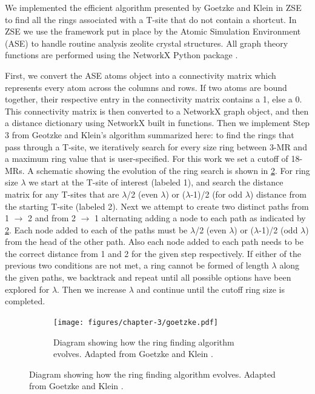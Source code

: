 \documentclass[preprint,numrefs,noinfo,sort&compress]{elsarticle}
\begin{document}
We implemented the efficient algorithm presented by Goetzke and Klein \cite{goetzke-properties-1991} in ZSE \cite{crum-jtcrumzse-2022} to find all the rings associated with a T-site that do not contain a shortcut. In ZSE we use the framework put in place by the Atomic Simulation Environment (ASE) \cite{hjorth-larsen-atomic-2017} to handle routine analysis zeolite crystal structures. All graph theory functions are performed using the NetworkX Python package \cite{hagberg-exploring-2008}. 

First, we convert the ASE atoms object into a connectivity matrix which represents every atom across the columns and rows. If two atoms are bound together, their respective entry in the connectivity matrix contains a 1, else a 0. This connectivity matrix is then converted to a NetworkX graph object, and then a distance dictionary using NetworkX built in functions. Then we implement Step 3 from Geotzke and Klein's algorithm \cite{goetzke-properties-1991} summarized here: to find the rings that pass through a T-site, we iteratively search for every size ring between 3-MR and a maximum ring value that is user-specified. For this work we set a cutoff of 18-MRs. A schematic showing the evolution of the ring search is shown in \cref{fig:goetzke}. For ring size \(\lambda\) we start at the T-site of interest (labeled 1), and search the distance matrix for any T-sites that are \(\lambda\)/2 (even \(\lambda\)) or (\(\lambda\)-1)/2 (for odd \(\lambda\)) distance from the starting T-site (labeled 2). Next we attempt to create two distinct paths from 1 \(\rightarrow\) 2 and from 2 \(\rightarrow\) 1 alternating adding a node to each path as indicated by \cref{fig:goetzke}. Each node added to each of the paths must be \(\lambda\)/2 (even \(\lambda\)) or (\(\lambda\)-1)/2 (odd \(\lambda\)) from the head of the other path. Also each node added to each path needs to be the correct distance from 1 and 2 for the given step respectively. If either of the previous two conditions are not met, a ring cannot be formed of length \(\lambda\) along the given paths, we backtrack and repeat until all possible options have been explored for \(\lambda\). Then we increase \(\lambda\) and continue until the cutoff ring size is completed.

\begin{figure}
\begin{figure}[H]
\centering
\texttt{[image: figures/chapter-3/goetzke.pdf]}
\caption{Diagram showing how the ring finding algorithm evolves. Adapted from Goetzke and Klein \cite{goetzke-properties-1991}. \label{fig:goetzke}}
\end{figure}
\end{figure}
\end{document}
